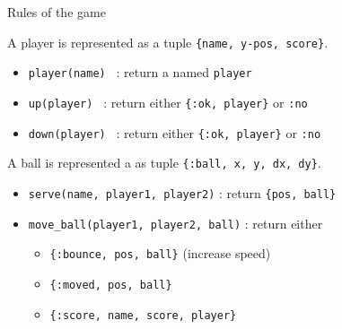 \begin{frame}{Rules of the game}

  \pause A player is represented as a tuple {\tt \{name, y-pos, score\}}.
  \vspace{10pt}

  \begin{itemize}
  \item {\tt player(name) } : return a named {\tt player}
  \item {\tt up(player) } : return either {\tt \{:ok, player\}} or {\tt :no}
  \item {\tt down(player) } : return either {\tt \{:ok, player\}} or {\tt :no}
  \end{itemize}
  \vspace{10pt}      
  \pause A ball is represented a as tuple {\tt \{:ball, x, y, dx, dy\}}. 
  \vspace{10pt}      
  \begin{itemize}
  \item {\tt serve(name, player1, player2)} : return {\tt \{pos, ball\}}
  \item {\tt move_ball(player1, player2, ball)} : return either
    
    \begin{itemize}
      \item {\tt \{:bounce, pos, ball\}}  (increase speed)
      \item {\tt \{:moved, pos, ball\}}
      \item {\tt \{:score, name, score, player\}}
    \end{itemize}
  
  \end{itemize}
      
    
\end{frame}








